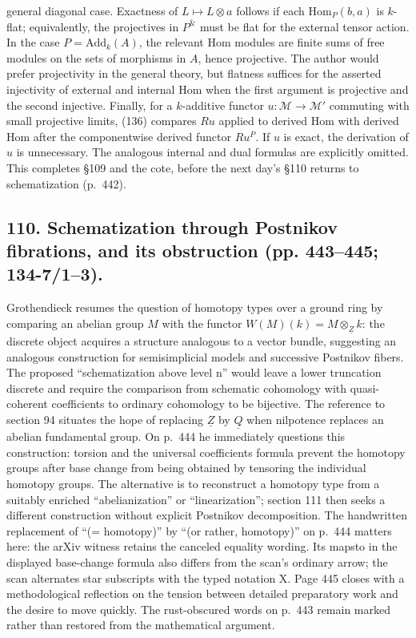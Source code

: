 \documentclass[10pt,oneside]{book}
\begin{document}
general diagonal case. Exactness of $L\mapsto L\otimes a$ follows if each $\mathrm{Hom}_P(b,a)$ is $k$-flat; equivalently, the projectives in $P^{\&}$ must be flat for the external tensor action. In the case $P=\mathrm{Add}_k(A)$, the relevant Hom modules are finite sums of free modules on the sets of morphisms in $A$, hence projective. The author would prefer projectivity in the general theory, but flatness suffices for the asserted injectivity of external and internal Hom when the first argument is projective and the second injective. Finally, for a $k$-additive functor $u:\mathcal M\to\mathcal M'$ commuting with small projective limits, (136) compares $Ru$ applied to derived Hom with derived Hom after the componentwise derived functor $Ru^P$. If $u$ is exact, the derivation of $u$ is unnecessary. The analogous internal and dual formulas are explicitly omitted. This completes \S109 and the cote, before the next day's \S110 returns to schematization (p.\ 442).

\subsection*{110. Schematization through Postnikov fibrations, and its obstruction (pp. 443--445; 134-7/1--3).}
Grothendieck resumes the question of homotopy types over a ground ring by comparing an abelian group $M$ with the functor $W(M)(k)=M\otimes_{\underline Z}k$: the discrete object acquires a structure analogous to a vector bundle, suggesting an analogous construction for semisimplicial models and successive Postnikov fibers. The proposed ``schematization above level n'' would leave a lower truncation discrete and require the comparison from schematic cohomology with quasi-coherent coefficients to ordinary cohomology to be bijective. The reference to section 94 situates the hope of replacing $\underline Z$ by $\underline Q$ when nilpotence replaces an abelian fundamental group. On p.~444 he immediately questions this construction: torsion and the universal coefficients formula prevent the homotopy groups after base change from being obtained by tensoring the individual homotopy groups. The alternative is to reconstruct a homotopy type from a suitably enriched ``abelianization'' or ``linearization''; section 111 then seeks a different construction without explicit Postnikov decomposition. The handwritten replacement of ``(= homotopy)'' by ``(or rather, homotopy)'' on p.~444 matters here: the arXiv witness retains the canceled equality wording. Its mapsto in the displayed base-change formula also differs from the scan's ordinary arrow; the scan alternates star subscripts with the typed notation X. Page 445 closes with a methodological reflection on the tension between detailed preparatory work and the desire to move quickly. The rust-obscured words on p.~443 remain marked rather than restored from the mathematical argument.
\end{document}

